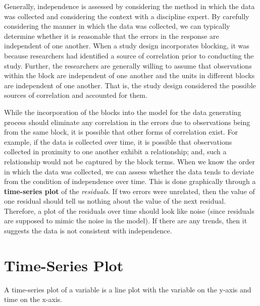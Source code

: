 \documentclass[
  letterpaper,
  DIV=11,
  numbers=noendperiod]{scrreprt}
\theoremstyle{plain}
\theoremstyle{definition}
\theoremstyle{definition}
\theoremstyle{remark}
\begin{document}
Generally, independence is assessed by considering the method in which
the data was collected and considering the context with a discipline
expert. By carefully considering the manner in which the data was
collected, we can typically determine whether it is reasonable that the
errors in the response are independent of one another. When a study
design incorporates blocking, it was because researchers had identified
a source of correlation prior to conducting the study. Further, the
researchers are generally willing to assume that observations within the
block are independent of one another and the units in different blocks
are independent of one another. That is, the study design considered the
possible sources of correlation and accounted for them.

While the incorporation of the blocks into the model for the data
generating process should eliminate any correlation in the errors due to
observations being from the same block, it is possible that other forms
of correlation exist. For example, if the data is collected over time,
it is possible that observations collected in proximity to one another
exhibit a relationship; and, such a relationship would not be captured
by the block terms. When we know the order in which the data was
collected, we can assess whether the data tends to deviate from the
condition of independence over time. This is done graphically through a
\textbf{time-series plot} of the \emph{residuals}. If two errors were
unrelated, then the value of one residual should tell us nothing about
the value of the next residual. Therefore, a plot of the residuals over
time should look like noise (since residuals are supposed to mimic the
noise in the model). If there are any trends, then it suggests the data
is not consistent with independence.

\section{Time-Series Plot}\label{time-series-plot-2}

A time-series plot of a variable is a line plot with the variable on the
y-axis and time on the x-axis.
\end{document}
